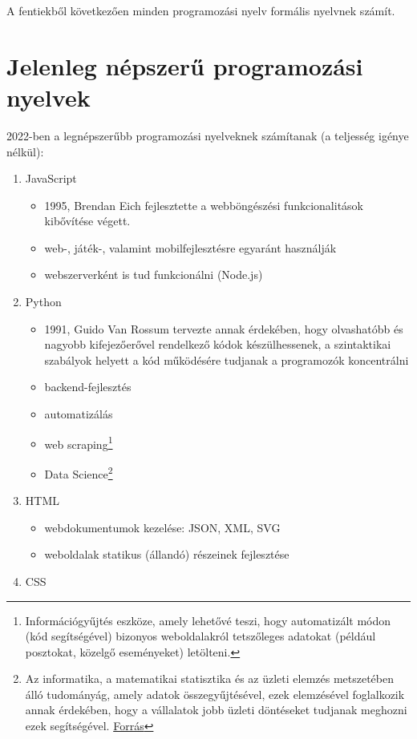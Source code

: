 \documentclass[tocnopagenum]{thesis-ekf}
\theoremstyle{definition}
\theoremstyle{remark}
\begin{document}
	A fentiekből következően minden programozási nyelv formális nyelvnek számít. 
	\section{Jelenleg népszerű programozási nyelvek}
	2022-ben a legnépszerűbb programozási nyelveknek számítanak (a teljesség igénye nélkül):
	\begin{enumerate}
		\item JavaScript
		\begin{itemize}
			\item 1995, Brendan Eich fejlesztette a webböngészési funkcionalitások kibővítése végett.
			\item web-, játék-, valamint mobilfejlesztésre egyaránt használják
			\item webszerverként is tud funkcionálni (Node.js)
		\end{itemize}
		\item Python
		\begin{itemize}
			\item 1991, Guido Van Rossum tervezte annak érdekében, hogy olvashatóbb és nagyobb kifejezőerővel rendelkező kódok készülhessenek, a szintaktikai szabályok helyett a kód működésére tudjanak a programozók koncentrálni
			\item backend-fejlesztés
			\item automatizálás
			\item web scraping\footnote{Információgyűjtés eszköze, amely lehetővé teszi, hogy automatizált módon (kód segítségével) bizonyos weboldalakról tetszőleges adatokat (például posztokat, közelgő eseményeket) letölteni.}
			\item Data Science\footnote{Az informatika, a matematikai statisztika és az üzleti elemzés metszetében álló tudományág, amely adatok összegyűjtésével, ezek elemzésével foglalkozik annak érdekében, hogy a vállalatok jobb üzleti döntéseket tudjanak meghozni ezek segítségével. \hyperref{https://qr.ae/pvlYmQ}{}{}{Forrás}}
		\end{itemize}
		\item HTML
		\begin{itemize}
			\item webdokumentumok kezelése: JSON, XML, SVG
			\item weboldalak statikus (állandó) részeinek fejlesztése
		\end{itemize}
		\item CSS 
		\begin{itemize}

\end{itemize}
\end{enumerate}
\end{document}
